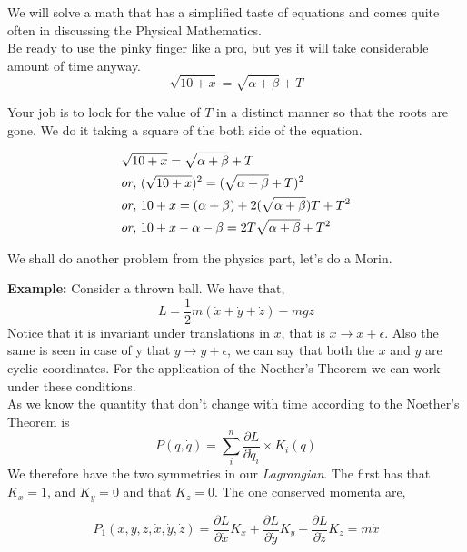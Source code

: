 \documentclass[11pt,a4paper]{article}
\begin{document}
We will solve a math that has a simplified taste of equations and comes quite often in discussing the Physical Mathematics.
\\
Be ready to use the pinky finger like a pro, but yes it will take considerable amount of time anyway.
\begin{equation}
\sqrt{10 + x} = \sqrt{\alpha + \beta} + T
\end{equation}
 
 Your job is to look for the value of $T$ in a distinct manner so that the roots are gone. We do it taking a square of the both side of the equation.
 
 \begin{align}
 &\sqrt{10 + x} = \sqrt{\alpha + \beta} + T \notag \\
 &or, \, ( \sqrt{ 10 + x } )^2 
  =
  (  \sqrt{\alpha + \beta} + T )^2 \notag \\
 &or, \, 10 + x = (\alpha + \beta) +
  2 ( \sqrt{ \alpha +\beta } ) T +
   T^2		\notag \\
 &or, \, 10 + x - \alpha - \beta = 2T \sqrt{ \alpha + \beta} + T^2  \notag 
 \end{align}

We shall do another problem from the physics part, let's do a Morin.

\textbf{Example:} Consider a thrown ball. We have that,
\[ L = \frac{1}{2}
m ( \dot{x} + \dot{y} + \dot{z} )
- mgz \]
Notice that it is invariant under translations in $x$, that is $x \rightarrow x+ \epsilon$. Also the same is seen in case of y that $y \rightarrow y + \epsilon$, we can say that both the $x$ and $y$ are cyclic coordinates. For the application of the Noether's Theorem we can work under these conditions.
\\
As we know the quantity that don't change with time according to the Noether's Theorem is 
\begin{equation}
P(q,\dot{q}) = \sum_{i}^{n}  \frac{\partial L}{\partial \dot{q}_i} \times K_i(q)
\end{equation}
We therefore have the two symmetries in our \emph{Lagrangian}. The first has that $K_x = 1$, and $K_y = 0$ and that $K_z = 0$. The one conserved momenta are,

\begin{equation}
P_1(x,y,z,\dot{x}, \dot{y} , \dot{z} ) = \frac{\partial L}{\partial \dot{x}}  K_x
+
\frac{\partial L}{\partial \dot{y}} K_y
+
\frac{ \partial L}{\partial \dot{z}} K_z = m \dot{x}
\end{equation}
\end{document}
